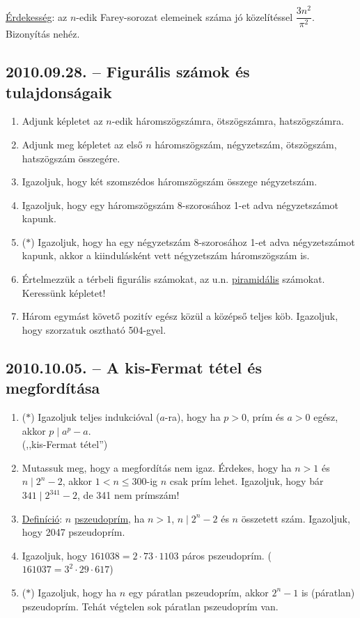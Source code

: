 \underline{Érdekesség}: az $n$-edik Farey-sorozat elemeinek száma jó közelítéssel $\dfrac{3n^2}{\pi^2}$. Bizonyítás nehéz.

\subsection*{2010.09.28. -- Figurális számok és tulajdonságaik}
\begin{enumerate}
\item Adjunk képletet az $n$-edik háromszögszámra, ötszögszámra, hatszögszámra.
\item Adjunk meg képletet az első $n$ háromszögszám, négyzetszám, ötszögszám, hatszögszám összegére.
\item Igazoljuk, hogy két szomszédos háromszögszám összege négyzetszám.
\item Igazoljuk, hogy egy háromszögszám 8-szorosához 1-et adva négyzetszámot kapunk.
\item ($*$) Igazoljuk, hogy ha egy négyzetszám 8-szorosához 1-et adva négyzetszámot kapunk, akkor a kiindulásként vett négyzetszám háromszögszám is.
\item Értelmezzük a térbeli figurális számokat, az u.n. \underline{piramidális} számokat. Keressünk képletet!
\item Három egymást követő pozitív egész közül a középső teljes köb. Igazoljuk, hogy szorzatuk osztható 504-gyel. 
\end{enumerate}

\subsection*{2010.10.05. -- A kis-Fermat tétel és megfordítása}
\begin{enumerate}
\item ($*$) Igazoljuk teljes indukcióval ($a$-ra), hogy ha $p>0$, prím és $a>0$ egész, akkor $p\mid a^p-a$.\\ (,,kis-Fermat tétel'')
\item Mutassuk meg, hogy a megfordítás nem igaz. Érdekes, hogy ha $n>1$ és $n\mid 2^n-2$, akkor $1<n\le 300$-ig $n$ csak prím lehet. Igazoljuk, hogy bár $341\mid 2^{341}-2$, de 341 nem prímszám!
\item \underline{Definíció}: $n$ \underline{pszeudoprím}, ha $n>1$, $n\mid 2^n-2$
és $n$ összetett szám. Igazoljuk, hogy 2047 pszeudoprím.
\item Igazoljuk, hogy $161038=2\cdot 73\cdot 1103$ páros pszeudoprím. 
($161037=3^2\cdot 29\cdot 617$)
\item ($*$) Igazoljuk, hogy ha $n$ egy páratlan pszeudoprím, akkor $2^n-1$ is
(páratlan) pszeudoprím. Tehát végtelen sok páratlan pszeudoprím van.
\end{enumerate}

